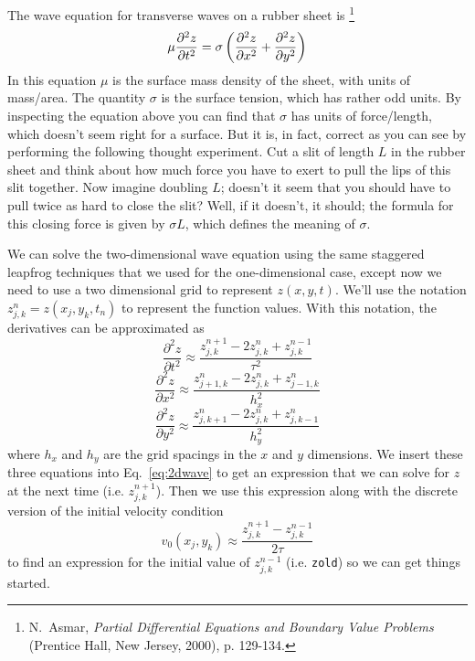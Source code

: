 

The wave equation for transverse waves on a rubber sheet is
\footnote{N.\ Asmar, {\it Partial Differential Equations and Boundary
Value Problems} (Prentice Hall, New Jersey, 2000), p. 129-134.}
\begin{equation}\label{eq:2dwave}
    \mu {\partial^2 z \over \partial t^2}= \sigma \left(
    {\partial^2 z \over \partial x^2} +
    {\partial^2 z \over \partial y^2} \right)
\end{equation}
In this equation $\mu$ is the surface mass density of the sheet, with
units of mass/area. The quantity $\sigma$ is the surface tension,
which has rather odd units. By inspecting the equation above you can
find that $\sigma$ has units of force/length, which doesn't seem
right for a surface. But it is, in fact, correct as you can see by
performing the following thought experiment. Cut a slit of length $L$
in the rubber sheet and think about how much force you have to exert
to pull the lips of this slit together. Now imagine doubling $L$;
doesn't it seem that you should have to pull twice as hard to close
the slit? Well, if it doesn't, it should; the formula for this
closing force is given by $\sigma L$, which defines the meaning of
$\sigma$.

We can solve the two-dimensional wave equation using the same
staggered leapfrog techniques that we used for the one-dimensional
case, except now we need to use a two dimensional grid to represent
$z(x,y,t)$.  We'll use the notation $z_{j,k}^n = z(x_j,y_k,t_n)$ to
represent the function values.  With this notation, the derivatives
can be approximated as
\begin{equation}
    \frac{\partial^2 z}{\partial t^2} \approx
    \frac{z_{j,k}^{n+1} - 2 z_{j,k}^{n} + z_{j,k}^{n-1}}{\tau^2}
\end{equation}
\begin{equation}
    \frac{\partial^2 z}{\partial x^2} \approx
    \frac{z_{j+1,k}^{n} - 2 z_{j,k}^{n} + z_{j-1,k}^{n}}{h_x^2}
\end{equation}
\begin{equation}
    \frac{\partial^2 z}{\partial y^2} \approx
    \frac{z_{j,k+1}^{n} - 2 z_{j,k}^{n} + z_{j,k-1}^{n}}{h_y^2}
\end{equation}
where $h_x$ and $h_y$ are the grid spacings in the $x$ and $y$
dimensions.  We insert these three equations into
Eq.~\eqref{eq:2dwave} to get an expression that we can solve for $z$
at the next time (i.e. $z_{j,k}^{n+1}$).  Then we use this expression
along with the discrete version of the initial velocity condition
\begin{equation}\label{eq:tDeriv}
    v_0(x_j,y_k) \approx \frac{z_{j,k}^{n+1} - z_{j,k}^{n-1}}{2 \tau}
\end{equation}
to find an expression for the initial value of $z_{j,k}^{n-1}$
(i.e. {\tt zold}) so we can get things started.


